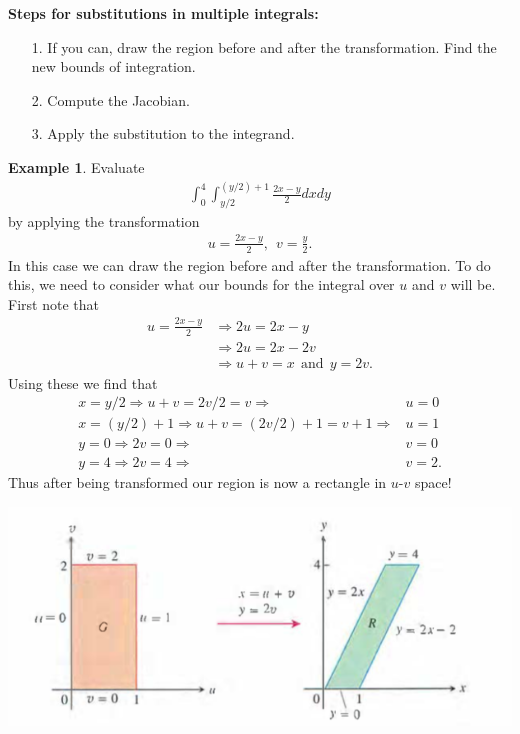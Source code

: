 \documentclass[12pt, letter]{article}
\theoremstyle{plain}
\numberwithin{theorem}{section}
\theoremstyle{definition}
\newtheorem{example}[theorem]{Example}
\begin{document}
\bigskip

\hrulefill

\bigskip

\textbf{Steps for substitutions in multiple integrals:}
\begin{itemize}
\item[1.] If you can, draw the region before and after the transformation. Find the new bounds of integration.
\item[2.] Compute the Jacobian.
\item[3.] Apply the substitution to the integrand.
\end{itemize}

\bigskip

\hrulefill

\bigskip

\begin{example}
Evaluate
\begin{align*}
\int_0^4 \int_{y/2}^{(y/2)+1} \frac{2x-y}{2}dxdy
\end{align*}
by applying the transformation
\begin{align*}
u=\frac{2x-y}{2}, \ \ v=\frac{y}{2}.
\end{align*}
In this case we can draw the region before and after the transformation. To do this, we need to consider what our bounds for the integral over $u$ and $v$ will be. First note that
\begin{align*}
u=\frac{2x-y}{2} &\Rightarrow 2u=2x-y\\
&\Rightarrow 2u=2x-2v\\
&\Rightarrow u+v=x \ \ \text{and} \ \ y=2v.
\end{align*}
Using these we find that
\begin{align*}
x=y/2 \Rightarrow u+v=2v/2=v \Rightarrow &u=0\\
x=(y/2)+1 \Rightarrow u+v=(2v/2)+1=v+1 \Rightarrow &u=1\\
y=0 \Rightarrow 2v=0 \Rightarrow &v=0\\
y=4 \Rightarrow 2v=4 \Rightarrow &v=2.
\end{align*}
Thus after being transformed our region is now a rectangle in $u$-$v$ space! 

\bigskip

\begin{center}
\includegraphics[scale=0.7]{m3_f25}
\end{center}


\end{example}
\end{document}
